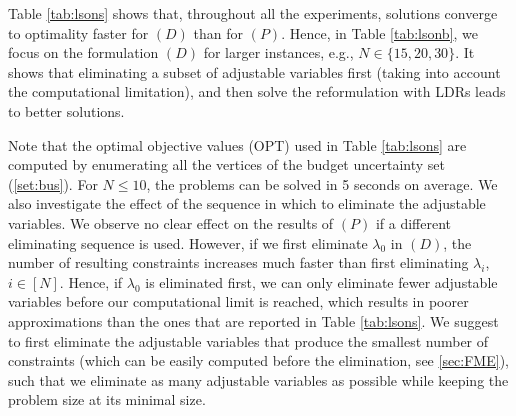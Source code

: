 \documentclass[fleqn,orsc,blindrev]{informs4}
\begin{document}
		
		Table \ref{tab:lsons} shows that, throughout all the experiments, solutions converge to optimality faster for $(D)$ than for $(P)$. Hence, in Table \ref{tab:lsonb}, we focus on the formulation $(D)$ for larger instances, e.g., $N\in \{15, 20,30 \}$. It shows that eliminating a subset of adjustable variables first (taking into account the computational limitation), and then solve the reformulation with LDRs leads to better solutions.
		
 {	Note that the optimal objective values (OPT) used in Table \ref{tab:lsons} are computed by enumerating all the vertices of the budget uncertainty set (\ref{set:bus}). For $N \le10 $, the problems can be solved in 5 seconds on average. We also investigate the effect of the sequence in which to eliminate the adjustable variables. We observe no clear effect on the results of $(P)$ if a different eliminating sequence is used. However, if we first eliminate $\lambda_0$ in $(D)$, the number of resulting constraints increases much faster than first eliminating  $\lambda_i$, $i\in [N]$. Hence, if $\lambda_0$ is eliminated first, we can only eliminate fewer adjustable variables before our computational limit is reached, which results in poorer approximations than the ones that are reported in Table \ref{tab:lsons}. We suggest to first eliminate the adjustable variables that produce the smallest number of constraints (which can be easily computed before the elimination, see \textsection \ref{sec:FME}), such that we eliminate as many adjustable variables as possible while keeping the problem size at its minimal size. }
		
\end{document}
